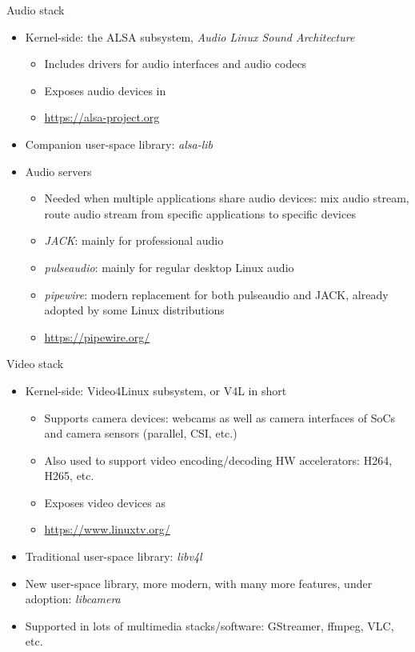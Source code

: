 \begin{frame}{Audio stack}
  \begin{itemize}
  \item Kernel-side: the ALSA subsystem, {\em Audio Linux Sound
      Architecture}
    \begin{itemize}
    \item Includes drivers for audio interfaces and audio codecs
    \item Exposes audio devices in 
    \item \url{https://alsa-project.org}
    \end{itemize}
  \item Companion user-space library: {\em alsa-lib}
  \item Audio servers
    \begin{itemize}
    \item Needed when multiple applications share audio devices: mix
      audio stream, route audio stream from specific applications to
      specific devices
    \item {\em JACK}: mainly for professional audio
    \item {\em pulseaudio}: mainly for regular desktop Linux audio
    \item {\em pipewire}: modern replacement for both pulseaudio and
      JACK, already adopted by some Linux distributions
    \item \url{https://pipewire.org/}
    \end{itemize}
  \end{itemize}
\end{frame}

\begin{frame}{Video stack}
  \begin{itemize}
  \item Kernel-side: Video4Linux subsystem, or V4L in short
    \begin{itemize}
    \item Supports camera devices: webcams as well as camera
      interfaces of SoCs and camera sensors (parallel, CSI, etc.)
    \item Also used to support video encoding/decoding HW
      accelerators: H264, H265, etc.
    \item Exposes video devices as 
    \item \url{https://www.linuxtv.org/}
    \end{itemize}
  \item Traditional user-space library: {\em libv4l}
  \item New user-space library, more modern, with many more features,
    under adoption: {\em libcamera}
  \item Supported in lots of multimedia stacks/software: GStreamer,
    ffmpeg, VLC, etc.
  \end{itemize}
\end{frame}


